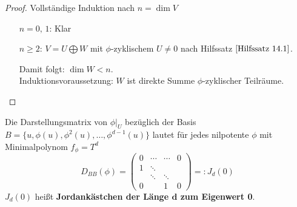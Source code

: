 \documentclass[parskip,a4paper,twoside,DIV15,BCOR12mm]{scrbook}
\begin{document}
\begin{proof}
Vollständige Induktion nach \(n=\dim V\)
\begin{itemize}
\item[\(n=0,\,1\):] Klar \checkmark
\item[\(n\geq2\):] \(V=U\bigoplus W\) mit \(\phi\)-zyklischem \(U\neq0\) nach
Hilfssatz \(\ref{Hilfssatz 14.1}\).

Damit folgt: \(\dim W<n\).\\
Induktionsvoraussetzung: \(W\) ist direkte Summe \(\phi\)-zyklischer 
Teilräume.
\end{itemize}
\end{proof}
\begin{remind}
Die Darstellungsmatrix von \(\phi|_{U}\) bezüglich der Basis
\(B=\{u,\phi(u),\phi^{2}(u),\ldots,\phi^{d-1}(u)\}\) lautet für jedes 
nilpotente \(\phi\) mit Minimalpolynom \(f_{\phi}=T^{d}\)
\[
D_{BB}(\phi)=\begin{pmatrix}
    0&\cdots&\cdots&0\\
    1&\ddots&& \\
     &\ddots&\ddots& \\
    0&&1&0
\end{pmatrix}=:J_{d}(0)
\]
\(J_{d}(0)\) heißt
    \textbf{Jordankästchen der Länge \(\mathbf{d}\) zum Eigenwert 0}.
\end{remind}
\end{document}

